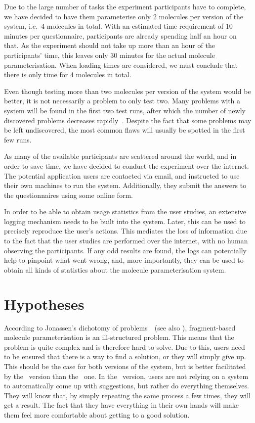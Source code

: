 Due to the large number of tasks the experiment participants have to complete, we have decided to have them parameterise only 2 molecules per version of the system, i.e.\ 4 molecules in total. With an estimated time requirement of 10 minutes per questionnaire, participants are already spending half an hour on that. As the experiment should not take up more than an hour of the participants' time, this leaves only 30 minutes for the actual molecule parameterisation. When loading times are considered, we must conclude that there is only time for 4 molecules in total.

Even though testing more than two molecules per version of the system would be better, it is not necessarily a problem to only test two. Many problems with a system will be found in the first two test runs, after which the number of newly discovered problems decreases rapidly~\cite{krug2006dont, nielsen2000you}. Despite the fact that some problems may be left undiscovered, the most common flaws will usually be spotted in the first few runs.

As many of the available participants are scattered around the world, and in order to save time, we have decided to conduct the experiment over the internet. The potential application users are contacted via email, and instructed to use their own machines to run the system. Additionally, they submit the answers to the questionnaires using some online form.

In order to be able to obtain usage statistics from the user studies, an extensive logging mechanism needs to be built into the system. Later, this can be used to precisely reproduce the user's actions. This mediates the loss of information due to the fact that the user studies are performed over the internet, with no human observing the participants. If any odd results are found, the logs can potentially help to pinpoint what went wrong, and, more importantly, they can be used to obtain all kinds of statistics about the molecule parameterisation system.



\section{Hypotheses}
According to Jonassen's dichotomy of problems~\cite{jonassen2000toward}~(see also ), fragment-based molecule parameterisation is an ill-structured problem. This means that the problem is quite complex and is therefore hard to solve. Due to this, users need to be ensured that there is a way to find a solution, or they will simply give up. This should be the case for both versions of the system, but is better facilitated by the \IDa\ version than the \IDb\ one. In the \IDa\ version, users are not relying on a system to automatically come up with suggestions, but rather do everything themselves. They will know that, by simply repeating the same process a few times, they will get a result. The fact that they have everything in their own hands will make them feel more comfortable about getting to a good solution.

